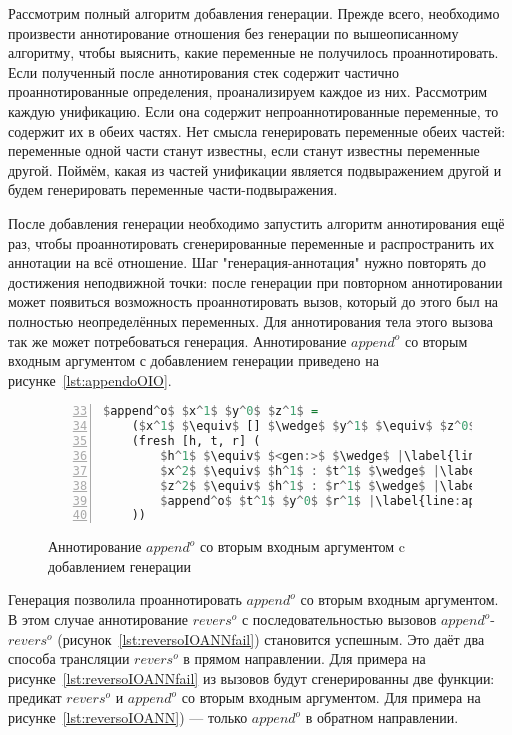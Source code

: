 Рассмотрим полный алгоритм добавления генерации.
Прежде всего, необходимо произвести аннотирование отношения без генерации по вышеописанному алгоритму, чтобы выяснить, какие переменные не получилось проаннотировать.
Если полученный после аннотирования стек содержит частично проаннотированные определения, проанализируем каждое из них.
Рассмотрим каждую унификацию.
Если она содержит непроаннотированные переменные, то содержит их в обеих частях.
Нет смысла генерировать переменные обеих частей: переменные одной части станут известны, если станут известны переменные другой.
Поймём, какая из частей унификации является подвыражением другой и будем генерировать переменные части-подвыражения.

После добавления генерации необходимо запустить алгоритм аннотирования ещё раз, чтобы проаннотировать сгенерированные переменные и распространить их аннотации на всё отношение.
Шаг "генерация-аннотация" нужно повторять до достижения неподвижной точки: после генерации при повторном аннотировании может появиться возможность проаннотировать вызов, который до этого был на полностью неопределённых переменных.
Для аннотирования тела этого вызова так же может потребоваться генерация.
Аннотирование $append^o$ со вторым входным аргументом с добавлением генерации приведено на рисунке~\ref{lst:appendoOIO}.

\begin{figure}[h!]
  \begin{center}
  \begin{minipage}{0.4\textwidth}
  \begin{lstlisting}[language=Haskell, frame=single, numbers=left,numberstyle=\small, firstnumber=33, escapechar=|]
  $append^o$ $x^1$ $y^0$ $z^1$ =
    ($x^1$ $\equiv$ [] $\wedge$ $y^1$ $\equiv$ $z^0$) $\vee$ |\label{line:appendoOIOANN2}|
    (fresh [h, t, r] (
        $h^1$ $\equiv$ $<gen:>$ $\wedge$ |\label{line:appendoOIOANN4}|
        $x^2$ $\equiv$ $h^1$ : $t^1$ $\wedge$ |\label{line:appendoOIOANN5}|
        $z^2$ $\equiv$ $h^1$ : $r^1$ $\wedge$ |\label{line:appendoOIOANN6}|
        $append^o$ $t^1$ $y^0$ $r^1$ |\label{line:appendoOIOANN7}|
    ))
    \end{lstlisting}
  \end{minipage}
  \end{center}
  \caption{Аннотирование $append^o$ со вторым входным аргументом c добавлением генерации}
  \label{lst:appendoOIOANN}
\end{figure}

Генерация позволила проаннотировать $append^o$ со вторым входным аргументом. 
В этом случае аннотирование $revers^o$ с последовательностью вызовов $append^o$-$revers^o$ (рисунок~\ref{lst:reversoIOANNfail}) становится успешным.
Это даёт два способа трансляции $revers^o$ в прямом направлении.
Для примера на рисунке~\ref{lst:reversoIOANNfail} из вызовов будут сгенерированны две функции: предикат $revers^o$ и $append^o$ со вторым входным аргументом.
Для примера на рисунке~\ref{lst:reversoIOANN}) --- только $append^o$ в обратном направлении.

